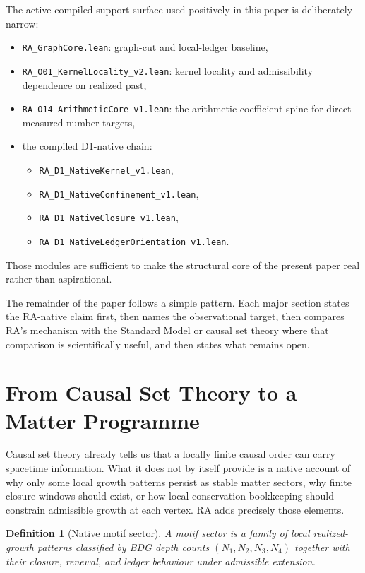 \documentclass[11pt]{article}
\newtheorem{definition}{Definition}
\begin{document}
The active compiled support surface used positively in this paper is deliberately narrow:
\begin{itemize}[nosep]
    \item \texttt{RA\_GraphCore.lean}: graph-cut and local-ledger baseline,
    \item \texttt{RA\_O01\_KernelLocality\_v2.lean}: kernel locality and admissibility dependence on realized past,
    \item \texttt{RA\_O14\_ArithmeticCore\_v1.lean}: the arithmetic coefficient spine for direct measured-number targets,
    \item the compiled D1-native chain:
    \begin{itemize}[nosep]
        \item \texttt{RA\_D1\_NativeKernel\_v1.lean},
        \item \texttt{RA\_D1\_NativeConfinement\_v1.lean},
        \item \texttt{RA\_D1\_NativeClosure\_v1.lean},
        \item \texttt{RA\_D1\_NativeLedgerOrientation\_v1.lean}.
    \end{itemize}
\end{itemize}
Those modules are sufficient to make the structural core of the present paper real rather than aspirational.

The remainder of the paper follows a simple pattern. Each major section states the RA-native claim first, then names the observational target, then compares RA's mechanism with the Standard Model or causal set theory where that comparison is scientifically useful, and then states what remains open.

\section{From Causal Set Theory to a Matter Programme}

Causal set theory already tells us that a locally finite causal order can carry spacetime information. What it does not by itself provide is a native account of why only some local growth patterns persist as stable matter sectors, why finite closure windows should exist, or how local conservation bookkeeping should constrain admissible growth at each vertex. RA adds precisely those elements.

\begin{definition}[Native motif sector]
A \emph{motif sector} is a family of local realized-growth patterns classified by BDG depth counts $(N_1,N_2,N_3,N_4)$ together with their closure, renewal, and ledger behaviour under admissible extension.
\end{definition}
\end{document}
